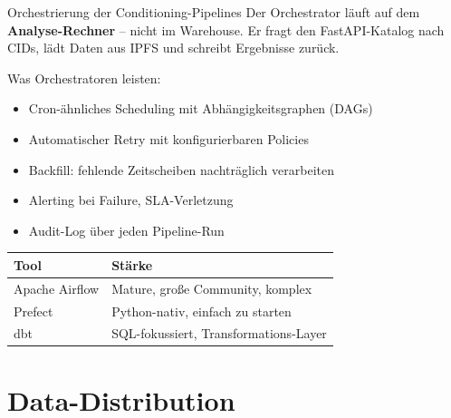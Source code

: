 \documentclass[aspectratio=169]{beamer}
\begin{document}
\begin{frame}{Orchestrierung der Conditioning-Pipelines}
  Der Orchestrator läuft auf dem \textbf{Analyse-Rechner} –
  nicht im Warehouse. Er fragt den FastAPI-Katalog nach CIDs,
  lädt Daten aus IPFS und schreibt Ergebnisse zurück.
  \vspace{0.3em}

  Was Orchestratoren leisten:
  \begin{itemize}
    \item Cron-ähnliches Scheduling mit Abhängigkeitsgraphen (DAGs)
    \item Automatischer Retry mit konfigurierbaren Policies
    \item Backfill: fehlende Zeitscheiben nachträglich verarbeiten
    \item Alerting bei Failure, SLA-Verletzung
    \item Audit-Log über jeden Pipeline-Run
  \end{itemize}
  \vspace{0.5em}
  \begin{tabular}{ll}
    \toprule
    \textbf{Tool} & \textbf{Stärke} \\
    \midrule
    Apache Airflow & Mature, große Community, komplex \\
    Prefect        & Python-nativ, einfach zu starten \\
    dbt            & SQL-fokussiert, Transformations-Layer \\
    \bottomrule
  \end{tabular}
\end{frame}


\section{Data-Distribution}
\end{document}
